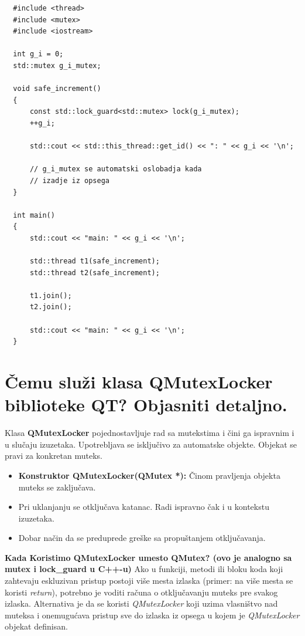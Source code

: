 \documentclass[a4paper]{article}
\begin{document}
\begin{lstlisting}
  #include <thread>
  #include <mutex>
  #include <iostream>
   
  int g_i = 0;
  std::mutex g_i_mutex; 
   
  void safe_increment()
  {
      const std::lock_guard<std::mutex> lock(g_i_mutex);
      ++g_i;
   
      std::cout << std::this_thread::get_id() << ": " << g_i << '\n';
   
      // g_i_mutex se automatski oslobadja kada
      // izadje iz opsega
  }
   
  int main()
  {
      std::cout << "main: " << g_i << '\n';
   
      std::thread t1(safe_increment);
      std::thread t2(safe_increment);
   
      t1.join();
      t2.join();
   
      std::cout << "main: " << g_i << '\n';
  }\end{lstlisting}

\section{Čemu služi klasa QMutexLocker biblioteke QT? Objasniti detaljno.}
  Klasa \textbf{QMutexLocker} pojednostavljuje rad sa mutekstima i čini ga ispravnim i u 
  slučaju izuzetaka. Upotrebljava se isključivo za automatske objekte. 
  Objekat se pravi za konkretan muteks.
  \begin{itemize}
    \item \textbf{Konstruktor QMutexLocker(QMutex *):} Činom pravljenja objekta muteks se zaključava.
    \item Pri uklanjanju se otključava katanac. Radi ispravno čak i u kontekstu izuzetaka.
    \item Dobar način da se preduprede greške sa propuštanjem otključavanja.
  \end{itemize}

  \textbf{Kada Koristimo QMutexLocker umesto QMutex? (ovo je analogno sa mutex i lock\_guard u C++-u)}
  Ako u funkciji, metodi ili bloku koda koji zahtevaju eskluzivan pristup postoji više mesta izlaska 
  (primer: na više mesta se koristi \textit{return}), potrebno je voditi računa o otključavanju muteks pre
  svakog izlaska. Alternativa je da se koristi \textit{QMutexLocker} koji uzima vlasništvo nad muteksa i onemugućava
  pristup sve do izlaska iz opsega u kojem je \textit{QMutexLocker} objekat definisan.
  
\end{document}
